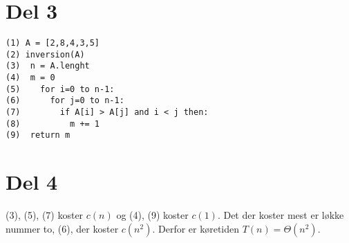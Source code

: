 \documentclass[a4paper]{article}
\begin{document}
\section*{Del 3}
\begin{lstlisting}
(1) A = [2,8,4,3,5]
(2) inversion(A)
(3)	 n = A.lenght
(4)	 m = 0
(5)	   for i=0 to n-1:
(6)	     for j=0 to n-1:
(7)		   if A[i] > A[j] and i < j then:
(8)			 m += 1 
(9)	 return m
\end{lstlisting}

\section*{Del 4}
(3), (5), (7) koster $c(n)$ og (4), (9) koster $c(1)$. Det der koster mest er løkke nummer to, (6), der koster $c(n^2)$. Derfor er køretiden $T(n) = \Theta(n^2)$.
\end{document}
